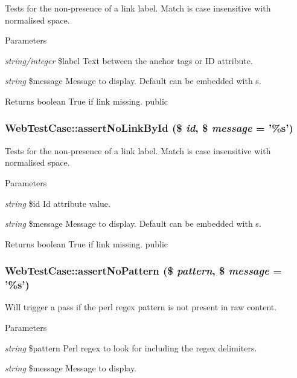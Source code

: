 \label{class_web_test_case_a317931c404b513787a96c801f852d01f}
Tests for the non-\/presence of a link label. Match is case insensitive with normalised space. 
\begin{DoxyParams}{Parameters}
\item[{\em string/integer}]\$label Text between the anchor tags or ID attribute. \item[{\em string}]\$message Message to display. Default can be embedded with s. \end{DoxyParams}
\begin{DoxyReturn}{Returns}
boolean True if link missing.  public 
\end{DoxyReturn}
\hypertarget{class_web_test_case_abd3882e405ceda10d1a4c0063e4bd07a}{
\subsubsection[{assertNoLinkById}]{\setlength{\rightskip}{0pt plus 5cm}WebTestCase::assertNoLinkById (\$ {\em id}, \/  \$ {\em message} = {\ttfamily '\%s'})}}
\label{class_web_test_case_abd3882e405ceda10d1a4c0063e4bd07a}
Tests for the non-\/presence of a link label. Match is case insensitive with normalised space. 
\begin{DoxyParams}{Parameters}
\item[{\em string}]\$id Id attribute value. \item[{\em string}]\$message Message to display. Default can be embedded with s. \end{DoxyParams}
\begin{DoxyReturn}{Returns}
boolean True if link missing.  public 
\end{DoxyReturn}
\hypertarget{class_web_test_case_a9c818bf7a210f58e765cc503e8cb69ea}{
\subsubsection[{assertNoPattern}]{\setlength{\rightskip}{0pt plus 5cm}WebTestCase::assertNoPattern (\$ {\em pattern}, \/  \$ {\em message} = {\ttfamily '\%s'})}}
\label{class_web_test_case_a9c818bf7a210f58e765cc503e8cb69ea}
Will trigger a pass if the perl regex pattern is not present in raw content. 
\begin{DoxyParams}{Parameters}
\item[{\em string}]\$pattern Perl regex to look for including the regex delimiters. \item[{\em string}]\$message Message to display. \end{DoxyParams}
